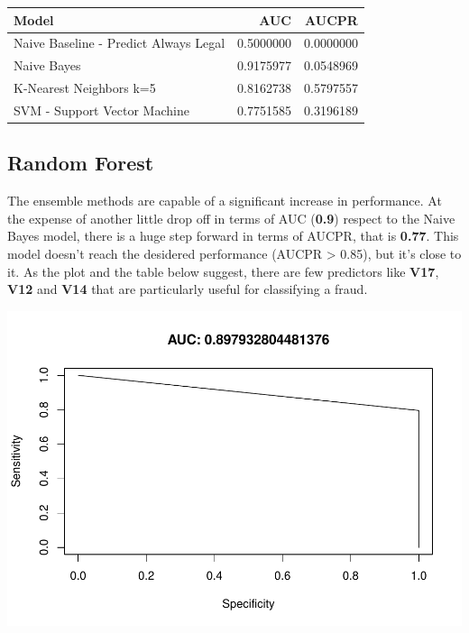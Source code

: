 \documentclass[]{article}
\begin{document}
\begin{table}[H]
\centering\begingroup\fontsize{10}{12}\selectfont

\begin{tabular}{l|r|r}
\hline
Model & AUC & AUCPR\\
\hline
Naive Baseline - Predict Always Legal & 0.5000000 & 0.0000000\\
\hline
Naive Bayes & 0.9175977 & 0.0548969\\
\hline
K-Nearest Neighbors k=5 & 0.8162738 & 0.5797557\\
\hline
SVM - Support Vector Machine & 0.7751585 & 0.3196189\\
\hline
\end{tabular}
\endgroup{}
\end{table}
\newpage

\hypertarget{random-forest}{%
\subsection{Random Forest}\label{random-forest}}

The ensemble methods are capable of a significant increase in
performance. At the expense of another little drop off in terms of AUC
(\textbf{0.9}) respect to the Naive Bayes model, there is a huge step
forward in terms of AUCPR, that is \textbf{0.77}. This model doesn't
reach the desidered performance (AUCPR \textgreater{} 0.85), but it's
close to it. As the plot and the table below suggest, there are few
predictors like \textbf{V17}, \textbf{V12} and \textbf{V14} that are
particularly useful for classifying a fraud.

\begin{center}\includegraphics{Credit_Card_Fraud_Detection_Project_Report_files/figure-latex/unnamed-chunk-20-1} \end{center}
\end{document}

